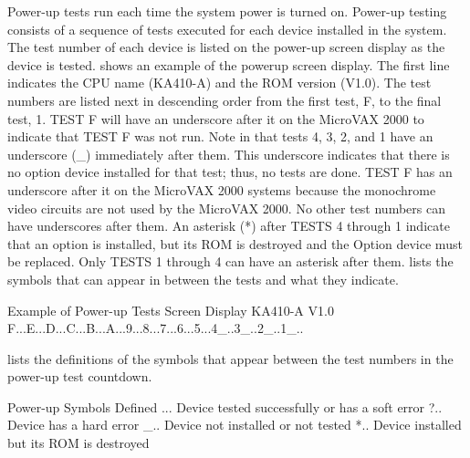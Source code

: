 Power-up tests run each time the system power is turned on. Power-up
testing consists of a sequence of tests executed for each device installed in
the system. The test number of each device is listed on the power-up screen
display as the device is tested.  shows an example of the powerup 
screen display. The first line indicates the CPU name (KA410-A) and the
ROM version (V1.0). The test numbers are listed next in descending order
from the first test, F, to the final test, 1. TEST F will have an underscore
after it on the MicroVAX 2000 to indicate that TEST F was not run. Note in
 that tests 4, 3, 2, and 1 have an underscore (\_) immediately after
them. This underscore indicates that there is no option device installed for
that test; thus, no tests are done. TEST F has an underscore after it on the
MicroVAX 2000 systems because the monochrome video circuits are not
used by the MicroVAX 2000. No other test numbers can have underscores
after them. An asterisk (*) after TESTS 4 through 1 indicate that an option is
installed, but its ROM is destroyed and the Option device must be replaced.
Only TESTS 1 through 4 can have an asterisk after them.  lists
the symbols that can appear in between the tests and what they indicate.

\begin{ttfig}{Example of Power-up Tests Screen Display}
KA410-A V1.0
F...E...D...C...B...A...9...8...7...6...5...4_..3_..2_..1_..
\end{ttfig}

 lists the definitions of the symbols that appear between the test
numbers in the power-up test countdown.

\begin{ttfig}{Power-up Symbols Defined}
    ...  Device tested successfully or has a soft error
    ?..  Device has a hard error
    _..  Device not installed or not tested
    *..  Device installed but its ROM is destroyed
\end{ttfig}

